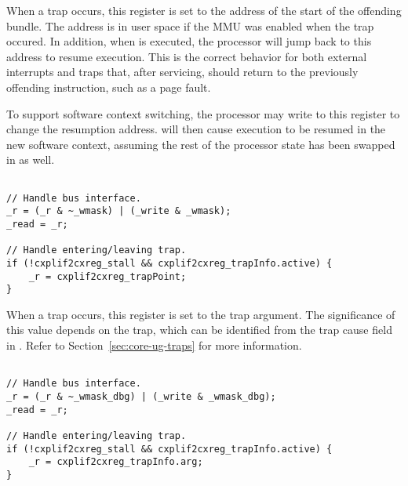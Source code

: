When a trap occurs, this register is set to the address of the start of the
offending bundle. The address is in user space if the MMU was enabled when the
trap occured. In addition, when  is executed, the processor will jump
back to this address to resume execution. This is the correct behavior for both
external interrupts and traps that, after servicing, should return to the
previously offending instruction, such as a page fault.

To support software context switching, the processor may write to this register
to change the resumption address.  will then cause execution to be
resumed in the new software context, assuming the rest of the processor state
has been swapped in as well.

\declaration{}
\implementation{}
\begin{lstlisting}

// Handle bus interface.
_r = (_r & ~_wmask) | (_write & _wmask);
_read = _r;

// Handle entering/leaving trap.
if (!cxplif2cxreg_stall && cxplif2cxreg_trapInfo.active) {
    _r = cxplif2cxreg_trapPoint;
}

\end{lstlisting}


When a trap occurs, this register is set to the trap argument. The significance
of this value depends on the trap, which can be identified from the trap cause
field in . Refer to Section~\ref{sec:core-ug-traps} for more
information.

\declaration{}
\implementation{}
\begin{lstlisting}

// Handle bus interface.
_r = (_r & ~_wmask_dbg) | (_write & _wmask_dbg);
_read = _r;

// Handle entering/leaving trap.
if (!cxplif2cxreg_stall && cxplif2cxreg_trapInfo.active) {
    _r = cxplif2cxreg_trapInfo.arg;
}

\end{lstlisting}

